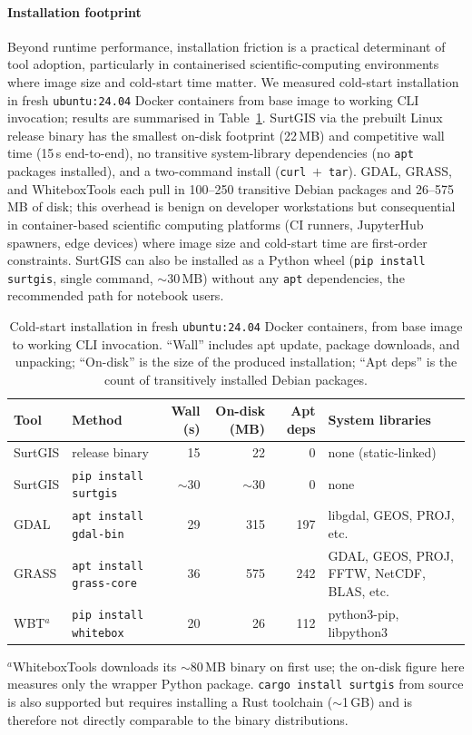 \documentclass[preprint,review,12pt,authoryear]{elsarticle}
\begin{document}
\paragraph{Installation footprint} Beyond runtime performance, installation friction is a practical determinant of tool adoption, particularly in containerised scientific-computing environments where image size and cold-start time matter. We measured cold-start installation in fresh \texttt{ubuntu:24.04} Docker containers from base image to working CLI invocation; results are summarised in Table~\ref{tab:install}. SurtGIS via the prebuilt Linux release binary has the smallest on-disk footprint (22\,MB) and competitive wall time (15\,s end-to-end), no transitive system-library dependencies (no \texttt{apt} packages installed), and a two-command install (\texttt{curl}~$+$~\texttt{tar}). GDAL, GRASS, and WhiteboxTools each pull in 100--250 transitive Debian packages and 26--575\,MB of disk; this overhead is benign on developer workstations but consequential in container-based scientific computing platforms (CI runners, JupyterHub spawners, edge devices) where image size and cold-start time are first-order constraints. SurtGIS can also be installed as a Python wheel (\texttt{pip install surtgis}, single command, $\sim$30\,MB) without any \texttt{apt} dependencies, the recommended path for notebook users.

\begin{table}[htbp]
\centering
\caption{Cold-start installation in fresh \texttt{ubuntu:24.04} Docker containers, from base image to working CLI invocation. ``Wall'' includes apt update, package downloads, and unpacking; ``On-disk'' is the size of the produced installation; ``Apt deps'' is the count of transitively installed Debian packages.}
\label{tab:install}
\begin{tabular}{@{}l l r r r p{2.6cm}@{}}
\toprule
Tool       & Method          & Wall (s) & On-disk (MB) & Apt deps & System libraries \\
\midrule
SurtGIS    & release binary  & 15       & 22           & 0        & none (static-linked) \\
SurtGIS    & \texttt{pip install surtgis} & $\sim$30 & $\sim$30 & 0 & none \\
GDAL       & \texttt{apt install gdal-bin} & 29 & 315  & 197      & libgdal, GEOS, PROJ, etc. \\
GRASS      & \texttt{apt install grass-core} & 36 & 575 & 242    & GDAL, GEOS, PROJ, FFTW, NetCDF, BLAS, etc. \\
WBT$^a$    & \texttt{pip install whitebox} & 20 & 26 & 112       & python3-pip, libpython3 \\
\bottomrule
\end{tabular}
\smallskip

{\footnotesize $^a$WhiteboxTools downloads its $\sim$80\,MB binary on first use; the on-disk figure here measures only the wrapper Python package. \texttt{cargo install surtgis} from source is also supported but requires installing a Rust toolchain ($\sim$1\,GB) and is therefore not directly comparable to the binary distributions.}
\end{table}
\end{document}
